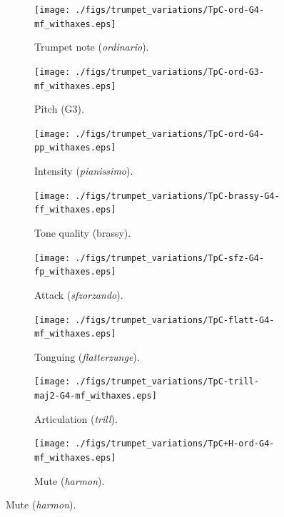 \documentclass{article}
\begin{document}
\begin{figure}
        \begin{subfigure}{0.25\textwidth}
                \centering
                \texttt{[image: ./figs/trumpet\_variations/TpC-ord-G4-mf\_withaxes.eps]}
                \caption{Trumpet note (\emph{ordinario}).}
                \label{fig:TpC-ord-G4-mf_withaxes}
        \end{subfigure}%
        \begin{subfigure}{0.25\textwidth}
                \centering
                \texttt{[image: ./figs/trumpet\_variations/TpC-ord-G3-mf\_withaxes.eps]}
                \caption{Pitch (G3).}
                \label{fig:TpC-ord-G3-mf_withaxes}
        \end{subfigure}%

        \begin{subfigure}{0.25\textwidth}
                \centering
                \texttt{[image: ./figs/trumpet\_variations/TpC-ord-G4-pp\_withaxes.eps]}
                \caption{Intensity (\emph{pianissimo}).}
                \label{fig:TpC-ord-G4-pp_withaxes}
        \end{subfigure}%
        \begin{subfigure}{0.25\textwidth}
                \centering
                \texttt{[image: ./figs/trumpet\_variations/TpC-brassy-G4-ff\_withaxes.eps]}
                \caption{Tone quality (brassy).}
                \label{fig:TpC-brassy-G4-mf_withaxes}
        \end{subfigure}%

        \begin{subfigure}{0.25\textwidth}
                \centering
                \texttt{[image: ./figs/trumpet\_variations/TpC-sfz-G4-fp\_withaxes.eps]}
                \caption{Attack (\emph{sfzorzando}).}
                \label{fig:TpC-sfz-G4-fp_withaxes}
        \end{subfigure}%
        \begin{subfigure}{0.25\textwidth}
                \centering
                \texttt{[image: ./figs/trumpet\_variations/TpC-flatt-G4-mf\_withaxes.eps]}
                \caption{Tonguing (\emph{flatterzunge}).}
                \label{fig:TpC-flatt-G4-mf_withaxes}
        \end{subfigure}


        \begin{subfigure}[b]{0.25\textwidth}
                \centering
                \texttt{[image: ./figs/trumpet\_variations/TpC-trill-maj2-G4-mf\_withaxes.eps]}
                \caption{Articulation (\emph{trill}).}
                \label{fig:TpC-trill-maj2-G4-mf_withaxes}
        \end{subfigure}%
        \begin{subfigure}[b]{0.25\textwidth}
                \centering
                \texttt{[image: ./figs/trumpet\_variations/TpC+H-ord-G4-mf\_withaxes.eps]}
                \caption{Mute (\emph{harmon}).}
                \label{fig:TpC+H-ord-G4-mf_withaxes}
        \end{subfigure}


\end{figure}
\end{document}
